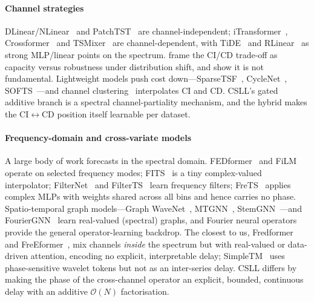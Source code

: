 \documentclass[journal,a4paper]{IEEEtran}
\begin{document}
\paragraph{Channel strategies} DLinear/NLinear~\citep{zeng2023dlinear} and
PatchTST~\citep{nie2023patchtst} are channel-independent; iTransformer~\citep{liu2024itransformer},
Crossformer~\citep{zhang2023crossformer} and TSMixer~\citep{chen2023tsmixer} are channel-dependent,
with TiDE~\citep{das2023tide} and RLinear~\citep{li2023rlinear} as strong MLP/linear points on the
spectrum. \citet{han2024capacity} frame the CI/CD trade-off as capacity versus robustness under
distribution shift, and show it is not fundamental. Lightweight models push cost
down---SparseTSF~\citep{lin2024sparsetsf}, CycleNet~\citep{lin2024cyclenet},
SOFTS~\citep{han2024softs}---and channel clustering~\citep{chen2024ccm} interpolates CI and CD.
CSLL's gated additive branch is a spectral channel-partiality mechanism, and the hybrid makes the
CI$\leftrightarrow$CD position itself learnable per dataset.

\paragraph{Frequency-domain and cross-variate models} A large body of work forecasts in the
spectral domain. FEDformer~\citep{zhou2022fedformer} and FiLM~\citep{zhou2022film} operate on
selected frequency modes; FITS~\citep{xu2024fits} is a tiny complex-valued interpolator;
FilterNet~\citep{yi2024filternet} and FilterTS~\citep{wang2025filterts} learn frequency filters;
FreTS~\citep{yi2023frets} applies complex MLPs with weights shared across all bins and hence
carries no phase. Spatio-temporal graph models---Graph WaveNet~\citep{wu2019graphwavenet},
MTGNN~\citep{wu2020mtgnn}, StemGNN~\citep{cao2020stemgnn}---and FourierGNN~\citep{yi2023fouriergnn}
learn real-valued (spectral) graphs, and Fourier neural operators~\citep{li2021fno,guibas2022afno}
provide the general operator-learning backdrop. The closest to us,
Fredformer~\citep{piao2024fredformer} and FreEformer~\citep{yue2025freeformer}, mix channels
\emph{inside} the spectrum but with real-valued or data-driven attention, encoding no explicit,
interpretable delay; SimpleTM~\citep{chen2025simpletm} uses phase-sensitive wavelet tokens but not
as an inter-series delay. CSLL differs by making the phase of the cross-channel operator an
explicit, bounded, continuous delay with an additive $\mathcal{O}(N)$ factorisation.
\end{document}
